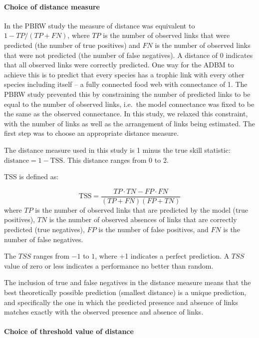 \documentclass{article}
\begin{document}
\hypertarget{choice-of-distance-measure}{%
\paragraph{Choice of distance
measure}\label{choice-of-distance-measure}}

In the PBRW study the measure of distance was equivalent to
\(1 - TP / (TP + FN)\), where \(TP\) is the number of observed links
that were predicted (the number of true positives) and \(FN\) is the
number of observed links that were not predicted (the number of false
negatives). A distance of 0 indicates that all observed links were
correctly predicted. One way for the ADBM to achieve this is to predict
that every species has a trophic link with every other species including
itself -- a fully connected food web with connectance of 1. The PBRW
study prevented this by constraining the number of predicted links to be
equal to the number of observed links, i.e.~the model connectance was
fixed to be the same as the observed connectance. In this study, we
relaxed this constraint, with the number of links as well as the
arrangement of links being estimated. The first step was to choose an
appropriate distance measure.

The distance measure used in this study is 1 minus the true skill
statistic: \(\text{distance} = 1 - \text{TSS}\). This distance ranges
from 0 to 2.

TSS is defined as:

\[ \text{TSS} = \frac{TP\cdot TN- FP \cdot FN}{(TP+FN)(FP+TN)} \] where
\(TP\) is the number of observed links that are predicted by the model
(true positives), \(TN\) is the number of observed absences of links
that are correctly predicted (true negatives), \(FP\) is the number of
false positives, and \(FN\) is the number of false negatives.

The \(TSS\) ranges from \(-1\) to \(1\), where +1 indicates a perfect
prediction. A \(TSS\) value of zero or less indicates a performance no
better than random.

The inclusion of true and false negatives in the distance measure means
that the best theoretically possible prediction (smallest distance) is a
unique prediction, and specifically the one in which the predicted
presence and absence of links matches exactly with the observed presence
and absence of links.

\hypertarget{choice-of-threshold-value-of-distance}{%
\paragraph{Choice of threshold value of
distance}\label{choice-of-threshold-value-of-distance}}
\end{document}
